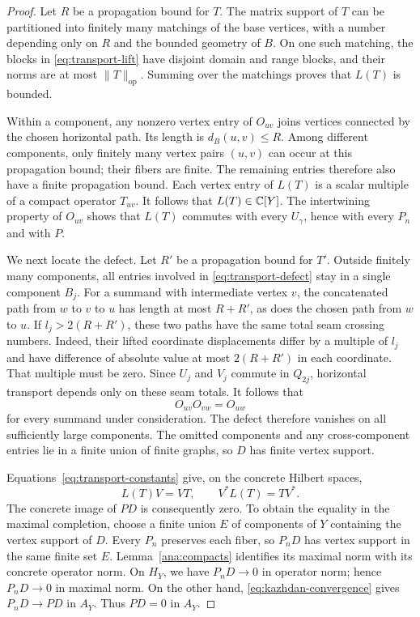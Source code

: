 \begin{proof}
Let $R$ be a propagation bound for $T$.  The matrix support of $T$ can
be partitioned into finitely many matchings of the base vertices, with a
number depending only on $R$ and the bounded geometry of $B$.  On one
such matching, the blocks in \eqref{eq:transport-lift} have disjoint
domain and range blocks, and their norms are at most $\|T\|_{\mathrm{op}}$.
Summing over the matchings proves that $L(T)$ is bounded.

Within a component, any nonzero vertex entry of $O_{uv}$ joins vertices
connected by the chosen horizontal path.  Its length is
$d_B(u,v)\le R$.  Among different components, only finitely many vertex
pairs $(u,v)$ can occur at this propagation bound; their fibers are
finite.  The remaining entries therefore also have a finite propagation
bound.  Each vertex entry of $L(T)$ is a scalar multiple of a compact
operator $T_{uv}$.  It follows that $L(T)\in\mathbb C[Y]$.
The intertwining property of $O_{uv}$ shows that $L(T)$ commutes with
every $U_\gamma$, hence with every $P_n$ and with $P$.

We next locate the defect.  Let $R'$ be a propagation bound for $T'$.
Outside finitely many components, all entries involved in
\eqref{eq:transport-defect} stay in a single component $B_j$.
For a summand with intermediate vertex $v$, the concatenated path from
$w$ to $v$ to $u$ has length at most $R+R'$, as does the chosen path
from $w$ to $u$.  If $l_j>2(R+R')$, these two paths have the same total
seam crossing numbers.  Indeed, their lifted coordinate displacements
differ by a multiple of $l_j$ and have difference of absolute value at
most $2(R+R')$ in each coordinate.  That multiple must be zero.
Since $U_j$ and $V_j$ commute in $Q_{2j}$, horizontal transport depends
only on these seam totals.  It follows that
\[
 O_{uv}O_{vw}=O_{uw}
\]
for every summand under consideration.  The defect therefore vanishes
on all sufficiently large components.  The omitted components and any
cross-component entries lie in a finite union of finite graphs, so $D$
has finite vertex support.

Equations~\eqref{eq:transport-constants} give, on the concrete Hilbert
spaces,
\[
 L(T)V=VT,\qquad V^*L(T)=TV^*.
\]
The concrete image of $PD$ is consequently zero.  To obtain the equality
in the maximal completion, choose a finite union $E$ of components of
$Y$ containing the vertex support of $D$.  Every $P_n$ preserves each
fiber, so $P_nD$ has vertex support in the same finite set $E$.
Lemma~\ref{ana:compacts} identifies its maximal norm with its concrete
operator norm.  On $H_Y$, we have $P_nD\to0$ in operator norm; hence
$P_nD\to0$ in maximal norm.  On the other hand,
\eqref{eq:kazhdan-convergence} gives $P_nD\to PD$ in $A_Y$.
Thus $PD=0$ in $A_Y$.
\end{proof}

